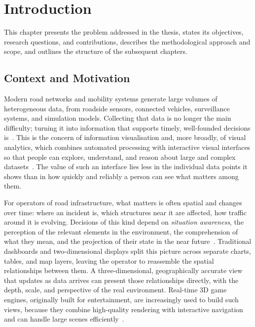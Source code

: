 \chapter{Introduction}
\label{chap:introduction}

\begin{introduction}
This chapter presents the problem addressed in the thesis, states its objectives, research questions, and contributions, describes the methodological approach and scope, and outlines the structure of the subsequent chapters.
\end{introduction}

\section{Context and Motivation}
\label{sec:context}

Modern road networks and mobility systems generate large volumes of heterogeneous data, from roadside sensors, connected vehicles, surveillance systems, and simulation models. Collecting that data is no longer the main difficulty; turning it into information that supports timely, well-founded decisions is~\cite{chen2014bigdata}. This is the concern of information visualisation and, more broadly, of visual analytics, which combines automated processing with interactive visual interfaces so that people can explore, understand, and reason about large and complex datasets~\cite{keim2010visualanalytics}. The value of such an interface lies less in the individual data points it shows than in how quickly and reliably a person can see what matters among them.

For operators of road infrastructure, what matters is often spatial and changes over time: where an incident is, which structures near it are affected, how traffic around it is evolving. Decisions of this kind depend on \emph{situation awareness}, the perception of the relevant elements in the environment, the comprehension of what they mean, and the projection of their state in the near future~\cite{endsley1995situation}. Traditional dashboards and two-dimensional displays split this picture across separate charts, tables, and map layers, leaving the operator to reassemble the spatial relationships between them. A three-dimensional, geographically accurate view that updates as data arrives can present those relationships directly, with the depth, scale, and perspective of the real environment. Real-time 3D game engines, originally built for entertainment, are increasingly used to build such views, because they combine high-quality rendering with interactive navigation and can handle large scenes efficiently~\cite{lyu2024ue5digitaltwin}.

